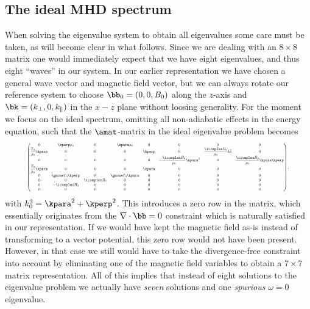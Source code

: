 \subsection{The ideal MHD spectrum}
When solving the eigenvalue system to obtain all eigenvalues some care must be taken, as will become clear in what follows. Since we are dealing with an $8 \times 8$ matrix one would immediately expect that we have eight eigenvalues, and thus eight ``waves'' in our system. In our earlier representation we have chosen a general wave vector and magnetic field vector, but we can always rotate our reference system to choose $\bb_0 = (0, 0, B_0)$ along the $z$-axis and $\bk = (k_\perp, 0, k_\parallel)$ in the $x-z$ plane without loosing generality. For the moment we focus on the ideal spectrum, omitting all non-adiabatic effects in the energy equation, such that the $\amat$-matrix in the ideal eigenvalue problem becomes
\begin{equation} \label{eq: ideal_matrix}
  \resizebox{0.89\hsize}{!}{$
    \begin{pmatrix}
      0 & \kperp \rho_0 & 0 & \kpara \rho_0 & 0 & 0 & 0 & 0 \\
      \dfrac{T_0}{\rho_0}\kperp & 0 & 0 & 0 & \kperp & 0 & \dfrac{\icomplex B_0}{\rho_0}k_0^2 & 0 \\
      0 & 0 & 0 & 0 & 0 & -\dfrac{\icomplex B_0}{\rho_0}\kpara^2 & 0 & \dfrac{\icomplex B_0}{\rho_0}\kpara \kperp \\
      \dfrac{T_0}{\rho_0}\kpara & 0 & 0 & 0 & \kpara & 0 & 0 & 0 \\
      0 & \gmone T_0 \kperp & 0 & \gmone T_0 \kpara & 0 & 0 & 0 & 0 \\
      0 & 0 & \icomplex B_0 & 0 & 0 & 0 & 0 & 0 \\
      0 & -\icomplex B_0 & 0 & 0 & 0 & 0 & 0 & 0 \\
      0 & 0 & 0 & 0 & 0 & 0 & 0 & 0
    \end{pmatrix},
  $}
\end{equation}
with $k_0^2 = \kpara^2 + \kperp^2$. This introduces a zero row in the matrix, which essentially originates from the $\nabla \cdot \bb = 0$ constraint which is naturally satisfied in our representation. If we would have kept the magnetic field as-is instead of transforming to a vector potential, this zero row would not have been present. However, in that case we still would have to take the divergence-free constraint into account by eliminating one of the magnetic field variables to obtain a $7 \times 7$ matrix representation. All of this implies that instead of eight solutions to the eigenvalue problem we actually have \emph{seven} solutions and one \emph{spurious} $\omega = 0$ eigenvalue.

